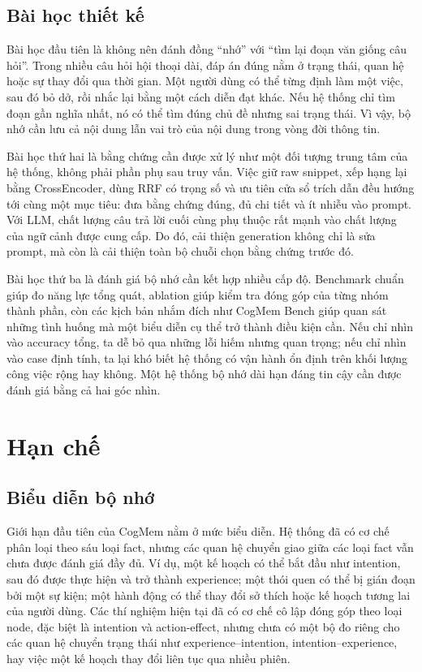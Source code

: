 \documentclass[../main.tex]{subfiles}
\begin{document}
\subsection{Bài học thiết kế}

Bài học đầu tiên là không nên đánh đồng ``nhớ'' với ``tìm lại đoạn văn giống câu hỏi''. Trong nhiều câu hỏi hội thoại dài, đáp án đúng nằm ở trạng thái, quan hệ hoặc sự thay đổi qua thời gian. Một người dùng có thể từng định làm một việc, sau đó bỏ dở, rồi nhắc lại bằng một cách diễn đạt khác. Nếu hệ thống chỉ tìm đoạn gần nghĩa nhất, nó có thể tìm đúng chủ đề nhưng sai trạng thái. Vì vậy, bộ nhớ cần lưu cả nội dung lẫn vai trò của nội dung trong vòng đời thông tin.

Bài học thứ hai là bằng chứng cần được xử lý như một đối tượng trung tâm của hệ thống, không phải phần phụ sau truy vấn. Việc giữ raw snippet, xếp hạng lại bằng CrossEncoder, dùng RRF có trọng số và ưu tiên cửa sổ trích dẫn đều hướng tới cùng một mục tiêu: đưa bằng chứng đúng, đủ chi tiết và ít nhiễu vào prompt. Với LLM, chất lượng câu trả lời cuối cùng phụ thuộc rất mạnh vào chất lượng của ngữ cảnh được cung cấp. Do đó, cải thiện generation không chỉ là sửa prompt, mà còn là cải thiện toàn bộ chuỗi chọn bằng chứng trước đó.

Bài học thứ ba là đánh giá bộ nhớ cần kết hợp nhiều cấp độ. Benchmark chuẩn giúp đo năng lực tổng quát, ablation giúp kiểm tra đóng góp của từng nhóm thành phần, còn các kịch bản nhắm đích như CogMem Bench giúp quan sát những tình huống mà một biểu diễn cụ thể trở thành điều kiện cần. Nếu chỉ nhìn vào accuracy tổng, ta dễ bỏ qua những lỗi hiếm nhưng quan trọng; nếu chỉ nhìn vào case định tính, ta lại khó biết hệ thống có vận hành ổn định trên khối lượng công việc rộng hay không. Một hệ thống bộ nhớ dài hạn đáng tin cậy cần được đánh giá bằng cả hai góc nhìn.

\section{Hạn chế}

\subsection{Biểu diễn bộ nhớ}

Giới hạn đầu tiên của CogMem nằm ở mức biểu diễn. Hệ thống đã có cơ chế phân loại theo sáu loại fact, nhưng các quan hệ chuyển giao giữa các loại fact vẫn chưa được đánh giá đầy đủ. Ví dụ, một kế hoạch có thể bắt đầu như intention, sau đó được thực hiện và trở thành experience; một thói quen có thể bị gián đoạn bởi một sự kiện; một hành động có thể thay đổi sở thích hoặc kế hoạch tương lai của người dùng. Các thí nghiệm hiện tại đã có cơ chế cô lập đóng góp theo loại node, đặc biệt là intention và action-effect, nhưng chưa có một bộ đo riêng cho các quan hệ chuyển trạng thái như experience--intention, intention--experience, hay việc một kế hoạch thay đổi liên tục qua nhiều phiên.
\end{document}
